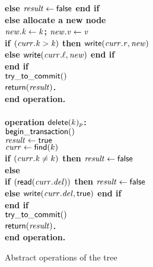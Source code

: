 \begin{figure}[h!]
{{\begin{minipage}[t]{150mm}
\begin{tabbing}
		 \>\>\>\> \bf{else} $\ms{result} \gets \lit{false}$ \bf{end if} \\%
		 \>\> {\bf else} allocate a new node \\%
		 \>\>\> $\ms{new.k} \gets \ms{k}$; $\ms{new.v} \gets \ms{v}$ \\
		 \>\>\> \bf{if} $(\ms{curr.k} > \ms{k})$ \bf{then} $\lit{write}(\ms{curr.r},\ms{new})$ \\%
		 \>\>\>\> \bf{else} $\lit{write}(\ms{curr.\ell}, \ms{new})$ \bf{end if} \\%
		 \> \bf{end if} \\
		 \> $\lit{try\_to\_commit}()$ \\
		 \> $\sf{return}(\ms{result})$. \\%
  {\bf end operation}. \\
\\

\bf{operation} $\act{delete}(k)_p$: \\
		 \> $\lit{begin\_transaction}()$ \\
		 \> $\ms{result} \gets \lit{true}$ \\
		 \> $\ms{curr} \gets \lit{find}(k)$ \\%
		 \> \bf{if} $(\ms{curr.k} \neq k)$ \bf{then} $\ms{result} \gets \lit{false}$\\%
		 \>\> \bf{else} \\
		 \>\>\> \bf{if} $(\lit{read}(\ms{curr.del}))$ \bf{then} $\ms{result} \gets \lit{false}$ \\%
		 \>\>\>\> \bf{else} $\lit{write}(\ms{curr.del}, \lit{true})$ {\bf end if} \\%
		 \> \bf{end if} \\
		 \> $\lit{try\_to\_commit}()$ \\
		 \> $\sf{return}(\ms{result})$. \\%
{\bf end operation}. 
\end{tabbing}
\normalsize
\end{minipage}
}
\caption{Abstract operations of the tree}
\label{fig:tree-abstract}
}
\end{figure}
   		
